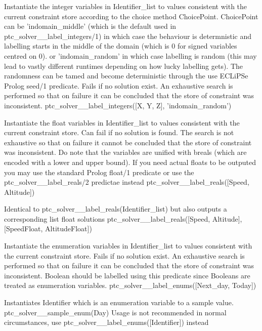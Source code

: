 \documentclass{article}
\begin{document}
    {Instantiate the integer variables in Identifier\_list to values consistent with the current constraint store according to the choice method ChoicePoint.
    ChoicePoint can be 'indomain\_middle' (which is the default used in ptc\_solver\_\_label\_integers/1) in which case the behaviour is determnistic and labelling starts in the middle of the domain (which is 0 for signed variables centred on 0).
    or 'indomain\_random' in which case labelling is random (this may lead to vastly different runtimes depending on how lucky labelling gets). The randomness can be tamed and become deterministic through the use ECLiPSe Prolog seed/1 predicate.
 Fails if no solution exist.
 An exhaustive search is performed so that on failure it can be concluded that the store of constraint was inconsistent.}
    {ptc\_solver\_\_label\_integers([X, Y, Z], 'indomain\_random')}
    {}

    {Instantiate the float variables in Identifier\_list to values consistent
with the current constraint store. Can fail if no solution is found. The search is
not exhaustive so that on failure it cannot be concluded that the store
of constraint was inconsistent. Do note that the variables are unified with breals (which are encoded with a lower and upper bound). If you need actual floats to be outputed you may use the standard Prolog float/1 predicate or use the ptc\_solver\_\_label\_reals/2 predictae instead}
    {ptc\_solver\_\_label\_reals([Speed, Altitude])}
    {}

    {Identical to ptc\_solver\_\_label\_reals(Identifier\_list) but also outputs a corresponding list float solutions}
    {ptc\_solver\_\_label\_reals([Speed, Altitude], [SpeedFloat, AltitudeFloat])}
    {}

    {Instantiate the enumeration variables in Identifier\_list to values
consistent
    with the current constraint store. Fails if no solution exist. An
exhaustive search is performed so that on failure it can be concluded
that the store of constraint was inconsistent. Boolean should be labelled
using this predicate since Booleans are treated as enumeration
variables.}
    {ptc\_solver\_\_label\_enums([Next\_day, Today])}
    {}

        {Instantiates Identifier which is an enumeration variable to a sample
value.}
        {ptc\_solver\_\_sample\_enum(Day)}
        {Usage is not recommended in normal circumstances, use
ptc\_solver\_\_label\_enums([Identifier]) instead}
\end{document}
